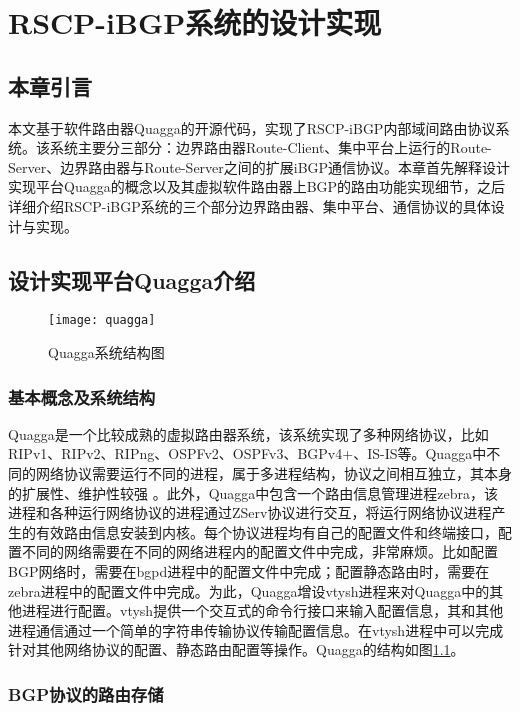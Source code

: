 \chapter{RSCP-iBGP系统的设计实现}
\label{cha:design}

\section{本章引言}
本文基于软件路由器Quagga\cite{quagga}的开源代码，实现了RSCP-iBGP内部域间路由协议系统。该系统主要分三部分：边界路由器Route-Client、集中平台上运行的Route-Server、边界路由器与Route-Server之间的扩展iBGP通信协议。本章首先解释设计实现平台Quagga的概念以及其虚拟软件路由器上BGP的路由功能实现细节，之后详细介绍RSCP-iBGP系统的三个部分边界路由器、集中平台、通信协议的具体设计与实现。

\section{设计实现平台Quagga介绍}

\begin{figure}
  \centering
  \texttt{[image: quagga]}
  \caption{Quagga系统结构图\cite{jakma2014quagga}}
  \label{fig:quagga}
\end{figure}


\subsection{基本概念及系统结构}
Quagga是一个比较成熟的虚拟路由器系统，该系统实现了多种网络协议，比如RIPv1、RIPv2、RIPng、OSPFv2、OSPFv3、BGPv4+、IS-IS等。Quagga中不同的网络协议需要运行不同的进程，属于多进程结构，协议之间相互独立，其本身的扩展性、维护性较强 \cite{quaggaThesis}。此外，Quagga中包含一个路由信息管理进程zebra，该进程和各种运行网络协议的进程通过ZServ协议进行交互，将运行网络协议进程产生的有效路由信息安装到内核\cite{jakma2014quagga}。每个协议进程均有自己的配置文件和终端接口，配置不同的网络需要在不同的网络进程内的配置文件中完成，非常麻烦。比如配置BGP网络时，需要在bgpd进程中的配置文件中完成；配置静态路由时，需要在zebra进程中的配置文件中完成。为此，Quagga增设vtysh进程来对Quagga中的其他进程进行配置。vtysh提供一个交互式的命令行接口来输入配置信息，其和其他进程通信通过一个简单的字符串传输协议传输配置信息。在vtysh进程中可以完成针对其他网络协议的配置、静态路由配置等操作。Quagga的结构如图\ref{fig:quagga}。
\subsection{BGP协议的路由存储}


